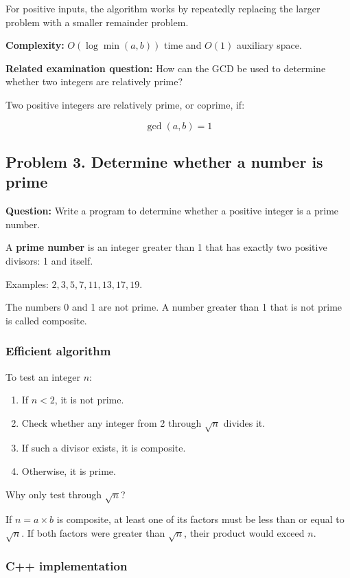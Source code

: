 For positive inputs, the algorithm works by repeatedly replacing the larger problem with a smaller remainder problem.

\textbf{Complexity:} $O(\log\min(a,b))$ time and $O(1)$ auxiliary space.

\textbf{Related examination question:} How can the GCD be used to determine whether two integers are relatively prime?

Two positive integers are relatively prime, or coprime, if:


\[
\boxed{\gcd(a,b)=1}
\]


\subsection{Problem 3. Determine whether a number is prime}

\textbf{Question:} Write a program to determine whether a positive integer is a prime number.

A \textbf{prime number} is an integer greater than 1 that has exactly two positive divisors: 1 and itself.

Examples: $2,3,5,7,11,13,17,19$.

The numbers 0 and 1 are not prime. A number greater than 1 that is not prime is called composite.

\subsubsection{Efficient algorithm}

To test an integer $n$:

\begin{enumerate}
    \item If $n<2$, it is not prime.
    \item Check whether any integer from 2 through $\sqrt n$ divides it.
    \item If such a divisor exists, it is composite.
    \item Otherwise, it is prime.
\end{enumerate}

Why only test through $\sqrt n$?

If $n=a\times b$ is composite, at least one of its factors must be less than or equal to $\sqrt n$. If both factors were greater than $\sqrt n$, their product would exceed $n$.

\subsubsection{C++ implementation}

